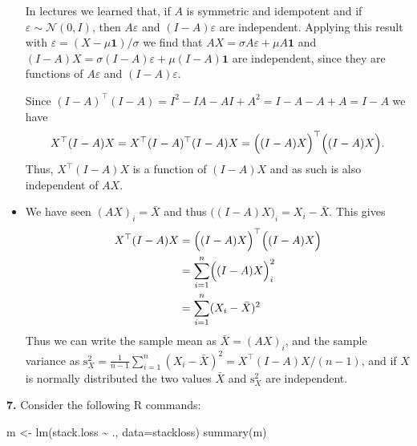 \documentclass[
  a4paper,
]{article}
\newenvironment{Shaded}{\begin{snugshade}}{\end{snugshade}}
\newcommand{\AttributeTok}[1]{\textcolor[rgb]{0.77,0.63,0.00}{#1}}
\newcommand{\FunctionTok}[1]{\textcolor[rgb]{0.00,0.00,0.00}{#1}}
\newcommand{\NormalTok}[1]{#1}
\newcommand{\OtherTok}[1]{\textcolor[rgb]{0.56,0.35,0.01}{#1}}
\newcommand{\SpecialCharTok}[1]{\textcolor[rgb]{0.00,0.00,0.00}{#1}}
\theoremstyle{definition}
\theoremstyle{definition}
\theoremstyle{definition}
\theoremstyle{definition}
\theoremstyle{remark}
\begin{document}
\begin{myanswers}
\begin{itemize}
  In lectures we learned that, if \(A\) is symmetric and idempotent
  and if \(\varepsilon\sim \mathcal{N}(0, I)\), then \(A\varepsilon\) and \((I-A)\varepsilon\) are
  independent. Applying this result with
  \(\varepsilon= (X - \mu \mathbf{1}) / \sigma\) we
  find that \(AX = \sigma A\varepsilon+ \mu A \mathbf{1}\) and
  \((I-A)X = \sigma (I-A)\varepsilon+ \mu (I-A)\mathbf{1}\)
  are independent, since they are functions of \(A\varepsilon\) and \((I-A)\varepsilon\).

  Since
  \((I - A)^\top (I - A) = I^2 - I A - A I + A^2 = I - A - A + A = I - A\) we have
  \begin{equation*}
    X^\top (I-A)X
    = X^\top (I - A)^\top (I-A)X
    = \Bigl( (I-A)X \Bigr)^\top \Bigl( (I-A)X \Bigr).
  \end{equation*}
  Thus, \(X^\top (I-A)X\) is a function of \((I-A)X\) and as such is
  also independent of \(AX\).
\item
  We have seen \((AX)_i = \bar X\) and thus
  \(\bigl((I - A)X\bigr)_i = X_i - \bar X\). This gives
  \begin{align*}
    X^\top (I-A)X
    &= \Bigl( (I-A)X \Bigr)^\top \Bigl( (I-A)X \Bigr) \\
    &= \sum_{i=1}^n \Bigl( (I-A)X \Bigr)_i^2 \\
    &= \sum_{i=1}^n (X_i - \bar X)^2
  \end{align*}
  Thus we can write the sample mean as \(\bar X = (AX)_i\), and the
  sample variance as
  \(\mathrm{s}_X^2 = \frac{1}{n-1} \sum_{i=1}^n (X_i - \bar X)^2 = X^\top (I-A)X / (n-1)\), and if \(X\) is normally distributed the
  two values \(\bar X\) and \(\mathrm{s}_X^2\) are independent.
\end{itemize}

\end{myanswers}

\textbf{7.} Consider the following R commands:

\begin{Shaded}
\begin{Highlighting}[]
\NormalTok{m }\OtherTok{\textless{}{-}} \FunctionTok{lm}\NormalTok{(stack.loss }\SpecialCharTok{\textasciitilde{}}\NormalTok{ ., }\AttributeTok{data=}\NormalTok{stackloss)}
\FunctionTok{summary}\NormalTok{(m)}
\end{Highlighting}
\end{Shaded}
\end{document}
